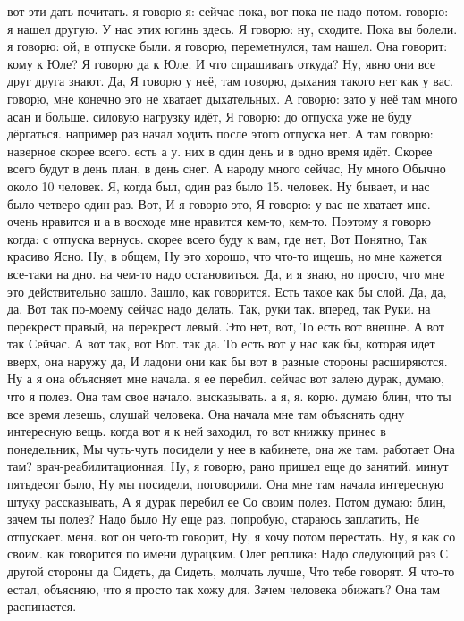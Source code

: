 вот эти дать почитать. я говорю я:
сейчас пока, вот пока не надо потом.
говорю: я нашел другую.
У нас этих югинь здесь.
Я говорю: ну, сходите.
Пока вы болели. я говорю: ой, в отпуске были. я говорю, переметнулся, там нашел.
Она говорит: кому к Юле?
Я говорю да к Юле.
И что спрашивать откуда?
Ну, явно они все друг друга знают.
Да, Я говорю у неё, там говорю, дыхания такого нет как у вас. говорю, мне конечно это не хватает дыхательных.
А говорю: зато у неё там много асан и больше.
силовую нагрузку идёт, Я говорю: до отпуска уже не буду дёргаться.
например раз начал ходить после этого отпуска нет. А там говорю: наверное скорее всего.
есть а у.
них в один день и в одно время идёт.
Скорее всего будут в день план, в день снег. А народу много сейчас, Ну много Обычно около 10 человек.
Я, когда был, один раз было 15.
человек. Ну бывает, и нас было четверо один раз. Вот, И я говорю это, Я говорю: у вас не хватает мне.
очень нравится и
а в восходе мне нравится кем-то, кем-то. Поэтому я говорю когда:
с отпуска вернусь.
скорее всего буду к вам, где нет, Вот Понятно, Так красиво Ясно. Ну, в общем,
Ну это хорошо, что что-то ищешь, но мне кажется все-таки на дно. на чем-то надо остановиться.
Да, и я знаю, но просто, что мне это действительно зашло.
Зашло, как говорится.
Есть такое как бы слой.
Да, да, да.
Вот так по-моему сейчас надо делать.
Так, руки так.
вперед, так Руки.
на перекрест правый, на перекрест левый. Это нет, вот, То есть вот внешне. А вот так Сейчас.
А вот так, вот Вот.
так да. То есть вот у нас как бы, которая идет вверх, она наружу да, И ладони они как бы вот в разные стороны расширяются.
Ну а я она объясняет мне начала. я ее перебил. сейчас вот залею дурак, думаю, что я полез. Она там свое начало.
высказывать. а я, я.
корю. думаю блин, что ты все время лезешь, слушай человека. Она начала мне там объяснять одну интересную вещь. когда вот я к ней заходил, то вот книжку принес в понедельник, Мы чуть-чуть посидели у нее в кабинете, она же там.
работает Она там?
врач-реабилитационная. Ну, я говорю, рано пришел еще до занятий.
минут пятьдесят было, Ну мы
посидели, поговорили. Она мне там начала интересную штуку рассказывать, А я дурак перебил ее Со своим полез. Потом думаю: блин, зачем ты полез? Надо было Ну еще раз.
попробую, стараюсь заплатить, Не отпускает.
меня. вот он чего-то говорит, Ну, я хочу потом перестать. Ну, я как со своим.
как говорится по имени дурацким.
Олег реплика: Надо следующий раз С другой стороны да Сидеть, да Сидеть, молчать лучше, Что тебе говорят. Я что-то естал, объясняю, что я просто так хожу для.
Зачем человека обижать? Она там распинается.
